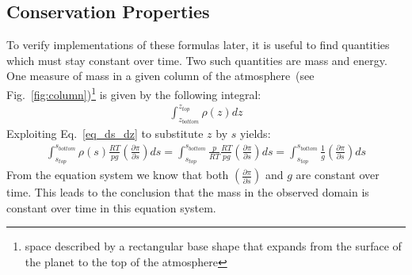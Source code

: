 \subsection{Conservation Properties}
To verify implementations of these formulas later, it is useful to find quantities which must stay constant over time.
Two such quantities are mass and energy.
One measure of mass in a given column of the atmosphere~(see Fig.~\ref{fig:column})\footnote{space described by a rectangular base shape that expands from the surface of the planet to the top of the atmosphere} is given by the following integral:
\begin{align*}
\int_{z_{bottom}}^{z_{top}}\rho(z)dz
\end{align*}
Exploiting Eq.~\ref{eq_ds_dz} to substitute $z$ by $s$ yields:
\begin{align}\label{eq_mass_conservation}
\int_{s_{top}}^{s_{bottom}}\rho(s)\frac{RT}{pg} \left( \frac{\partial \pi}{\partial s} \right) ds = \int_{s_{top}}^{s_{bottom}}\frac{p}{RT}\frac{RT}{pg} \left( \frac{\partial \pi}{\partial s} \right) ds = \int_{s_{top}}^{s_{bottom}}\frac{1}{g}\left( \frac{\partial \pi}{\partial s} \right) ds
\end{align}
From the equation system we know that both $\left( \frac{\partial \pi}{\partial s} \right)$ and $g$ are constant over time.
This leads to the conclusion that the mass in the observed domain is constant over time in this equation system.
\\

